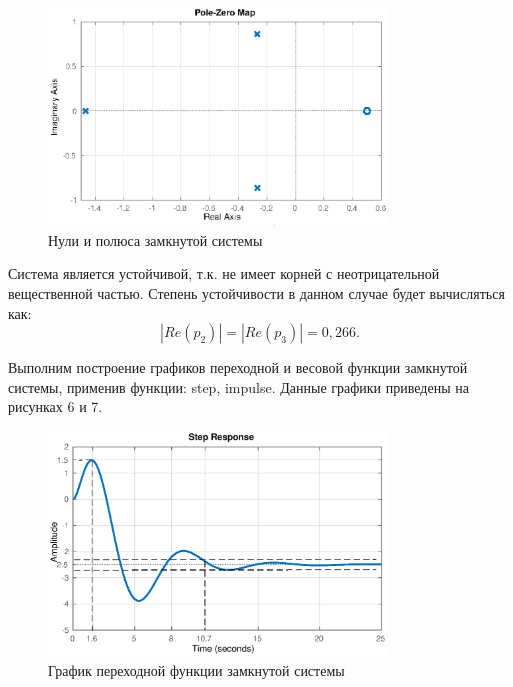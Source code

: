 \documentclass[12pt, a4paper]{article}
\begin{document}
\begin{figure}[H]
\centering
\includegraphics[width=0.8\textwidth]{1/im3.eps}
\caption{Нули и полюса замкнутой системы}
\end{figure}
\par Система является устойчивой, т.к. не имеет корней с неотрицательной вещественной частью. Степень устойчивости в данном случае будет
вычисляться как:
\begin{equation}
    |Re (p_2)| = |Re(p_3)| = 0,266.
\end{equation}

\par Выполним построение графиков переходной и весовой функции замкнутой системы, применив функции: step, impulse.
Данные графики приведены на рисунках 6 и 7. 
\begin{figure}[H]
\centering
\includegraphics[width=0.8\textwidth]{1/step.eps}
\caption{График переходной функции замкнутой системы}
\end{figure}
\end{document}
